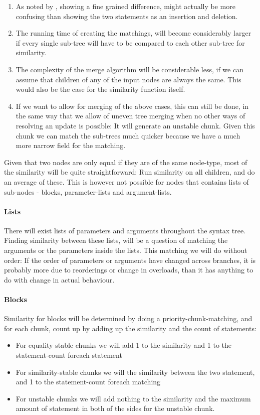 \documentclass[11pt]{article}
\begin{document}
\begin{enumerate}
\item As noted by \citet{Hashimoto}, showing a fine grained difference, might actually be more confusing than showing the two statements as an insertion and deletion.
\item The running time of creating the matchings, will become considerably larger if every single sub-tree will have to be compared to each other sub-tree for similarity.
\item The complexity of the merge algorithm will be considerable less, if we can assume that children of any of the input nodes are always the same. This would also be the case for the similarity function itself.
\item If we want to allow for merging of the above cases, this can still be done, in the same way that we allow of uneven tree merging when no other ways of resolving an update is possible: It will generate an unstable chunk. Given this chunk we can match the sub-trees much quicker because we have a much more narrow field for the matching.
\end{enumerate}

Given that two nodes are only equal if they are of the same node-type, most of the similarity will be quite straightforward: Run similarity on all children, and do an average of these. This is however not possible for nodes that contains lists of sub-nodes - blocks, parameter-lists and argument-lists.

\paragraph{Lists} There will exist lists of parameters and arguments throughout the syntax tree. Finding similarity between these lists, will be a question of matching the arguments or the parameters inside the lists. This matching we will do without order: If the order of parameters or arguments have changed across branches, it is probably more due to reorderings or change in overloads, than it has anything to do with change in actual behaviour.

\paragraph{Blocks} Similarity for blocks will be determined by doing a priority-chunk-matching, and for each chunk, count up by adding up the similarity and the count of statements:

\begin{itemize}
	\item For equality-stable chunks we will add 1 to the similarity and 1 to the statement-count foreach statement
	\item For similarity-stable chunks we will the similarity between the two statement, and 1 to the statement-count foreach matching
	\item For unstable chunks we will add nothing to the similarity and the maximum amount of statement in both of the sides for the unstable chunk.
\end{itemize}
\end{document}
